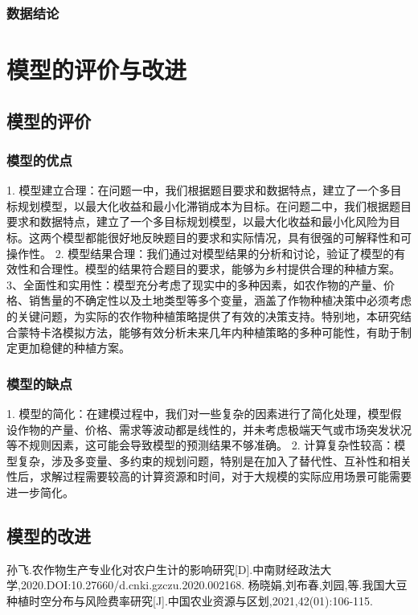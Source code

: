 \documentclass{cumcmthesis}
\begin{document}
\subsubsection{数据结论}






\section{模型的评价与改进}
\subsection{模型的评价}
\subsubsection{模型的优点}
1. 模型建立合理：在问题一中，我们根据题目要求和数据特点，建立了一个多目标规划模型，以最大化收益和最小化滞销成本为目标。在问题二中，我们根据题目要求和数据特点，建立了一个多目标规划模型，以最大化收益和最小化风险为目标。这两个模型都能很好地反映题目的要求和实际情况，具有很强的可解释性和可操作性。
2. 模型结果合理：我们通过对模型结果的分析和讨论，验证了模型的有效性和合理性。模型的结果符合题目的要求，能够为乡村提供合理的种植方案。
3、全面性和实用性：模型充分考虑了现实中的多种因素，如农作物的产量、价格、销售量的不确定性以及土地类型等多个变量，涵盖了作物种植决策中必须考虑的关键问题，为实际的农作物种植策略提供了有效的决策支持。特别地，本研究结合蒙特卡洛模拟方法，能够有效分析未来几年内种植策略的多种可能性，有助于制定更加稳健的种植方案。
\subsubsection{模型的缺点}
1. 模型的简化：在建模过程中，我们对一些复杂的因素进行了简化处理，模型假设作物的产量、价格、需求等波动都是线性的，并未考虑极端天气或市场突发状况等不规则因素，这可能会导致模型的预测结果不够准确。
2. 计算复杂性较高：模型复杂，涉及多变量、多约束的规划问题，特别是在加入了替代性、互补性和相关性后，求解过程需要较高的计算资源和时间，对于大规模的实际应用场景可能需要进一步简化。


\subsection{模型的改进}
\begin{thebibliography}{99}  
 孙飞.农作物生产专业化对农户生计的影响研究[D].中南财经政法大学,2020.DOI:10.27660/d.cnki.gzczu.2020.002168.
 杨晓娟,刘布春,刘园,等.我国大豆种植时空分布与风险费率研究[J].中国农业资源与区划,2021,42(01):106-115.

\end{thebibliography}
    
\end{document}
